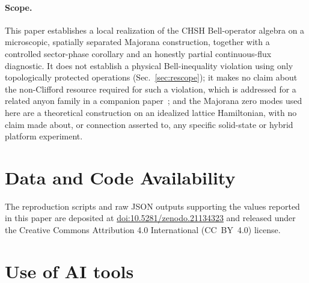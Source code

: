 \documentclass[aps,pra,twocolumn,superscriptaddress,floatfix,nofootinbib]{revtex4-2}
\begin{document}
\paragraph{Scope.} This paper establishes a local realization of the
CHSH Bell-operator algebra on a microscopic, spatially separated
Majorana construction, together with a controlled sector-phase
corollary and an honestly partial continuous-flux diagnostic. It does
not establish a physical Bell-inequality violation using only
topologically protected operations (Sec.~\ref{sec:rescope}); it makes
no claim about the non-Clifford resource required for such a
violation, which is addressed for a related anyon family in a
companion paper~\cite{Sayim2026magic}; and the Majorana zero modes used
here are a theoretical construction on an idealized lattice
Hamiltonian, with no claim made about, or connection asserted to, any
specific solid-state or hybrid platform experiment.

\section*{Data and Code Availability}
The reproduction scripts and raw JSON outputs supporting the values
reported in this paper are deposited at
\href{https://doi.org/10.5281/zenodo.21134323}{doi:10.5281/zenodo.21134323}
and released under the Creative Commons Attribution 4.0 International
(CC~BY~4.0) license.

\section*{Use of AI tools}
\end{document}
